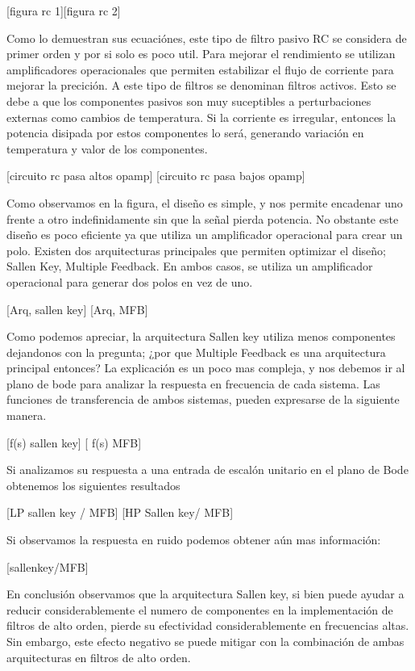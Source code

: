 \documentclass[11pt]{article}
\begin{document}
[figura rc 1][figura rc 2]

Como lo demuestran sus ecuaciónes, este tipo de filtro pasivo RC se considera de primer orden y por si solo es poco util. Para mejorar el rendimiento se utilizan amplificadores operacionales que permiten estabilizar el flujo de corriente para mejorar la precición. A este tipo de filtros se denominan filtros activos. Esto se debe a que los componentes pasivos son muy suceptibles a perturbaciones externas como cambios de temperatura. Si la corriente es irregular, entonces la potencia disipada por estos componentes lo será, generando variación en temperatura y valor de los componentes.

[circuito rc pasa altos opamp]
[circuito rc pasa bajos opamp]

Como observamos en la figura, el diseño es simple, y nos permite encadenar uno frente a otro indefinidamente sin que la señal pierda potencia. No obstante este diseño es poco eficiente ya que utiliza un amplificador operacional para crear un polo. Existen dos arquitecturas principales que permiten optimizar el diseño; Sallen Key, Multiple Feedback. En ambos casos, se utiliza un amplificador operacional para generar dos polos en vez de uno.

[Arq, sallen key] [Arq, MFB]

Como podemos apreciar, la arquitectura Sallen key utiliza menos componentes dejandonos con la pregunta; ¿por que Multiple Feedback es una arquitectura principal entonces? La explicación es un poco mas compleja, y nos debemos ir al plano de bode para analizar la respuesta en frecuencia de cada sistema. Las funciones de transferencia de ambos sistemas, pueden expresarse de la siguiente manera.

[f(s) sallen key] [ f(s) MFB]

Si analizamos su respuesta a una entrada de escalón unitario en el plano de Bode obtenemos los siguientes resultados

[LP sallen key / MFB]
[HP Sallen key/ MFB]

Si observamos la respuesta en ruido podemos obtener aún mas información: 

[sallenkey/MFB]

En conclusión observamos que la arquitectura Sallen key, si bien puede ayudar a reducir considerablemente el numero de componentes en la implementación de filtros de alto orden, pierde su efectividad considerablemente en frecuencias altas. Sin embargo, este efecto negativo se puede mitigar con la combinación de ambas arquitecturas en filtros de alto orden.
\end{document}
